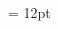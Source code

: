 \documentclass[gps1,twoside]{article}
\begin{document}
\begin{spacing}{0.916666666666667}
\begin{center}
\begin{center}
 \label{PageStock_BRTag3} \end{center}
\end{center}\end{spacing}\setlength{\columnsep}{12pt} 
\setlength\columnseprule{0.4pt} 
\begin{multicols}{2}\begin{spacing}{0.458333333333333}{\raggedright} \begin{spacing}{0.458333333333333}
\hangindent= 12pt
  \\ \headwordafterentryletDatadicBody{}\spanenpronunciationggofonipaxemicspanentryletDatadicBody{[}\spanenpronunciationggofonipaxemicspanentryletDatadicBody{]}  \grammaticalinfoaftersensespanentryletDatadicBody{} \end{spacing}
 \end{spacing}\end{multicols}
\end{document}
